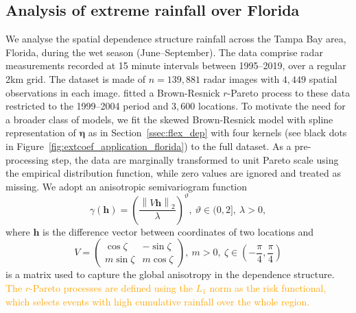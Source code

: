 \documentclass[12pt]{article}
\newcommand{\PZ}{\textcolor{orange}}
\begin{document}
\subsection{Analysis of extreme rainfall over Florida}

We analyse the spatial dependence structure rainfall across the Tampa Bay area, Florida, during the wet season (June--September).
The data comprise radar measurements recorded at 15 minute intervals between 1995--2019, over a regular 2km grid. The dataset is made of $n=139,881$ radar images with $4,449$ spatial observations in each image.
%
\cite{deFondeville.Davison:2018} fitted a Brown-Resnick $r$-Pareto process to these data restricted to the 1999--2004 period and $3,600$ locations. 
%
To motivate the need for a broader class of models, we fit the skewed Brown-Resnick model with spline representation of $\bm\eta$ as in Section~\ref{ssec:flex_dep} with four kernels (see black dots in Figure~\ref{fig:extcoef_application_florida}) to the full dataset.
%
As a pre-processing step, the data are marginally transformed to unit Pareto scale using the empirical distribution function, while zero values are ignored and treated as missing. 
%
We adopt an anisotropic semivariogram function
%
\begin{equation}
    \label{eq:semivar}
    \gamma(\bm h) = \left(\frac{\left\| V \bm h\right\|_2}{\lambda}\right)^\vartheta, \:\vartheta\in(0,2],\:\lambda>0,
\end{equation}
%
where $\bm h$ is the difference vector between coordinates of two locations and 
%
\begin{equation*}
\label{eq:aniso_mat}
    V = \begin{pmatrix}
    \cos\zeta & - \sin\zeta\\
    m\sin\zeta &  m\cos\zeta
    \end{pmatrix},\: m >0 , \:\zeta\in (-\frac{\pi}{4},\frac{\pi}{4})
\end{equation*}
is a matrix used to capture the global anisotropy in the dependence structure.
%
\PZ{The $r$-Pareto processes are defined using the $L_1$ norm as the risk functional, %
which selects events with high cumulative rainfall over the whole region.} 
\end{document}
